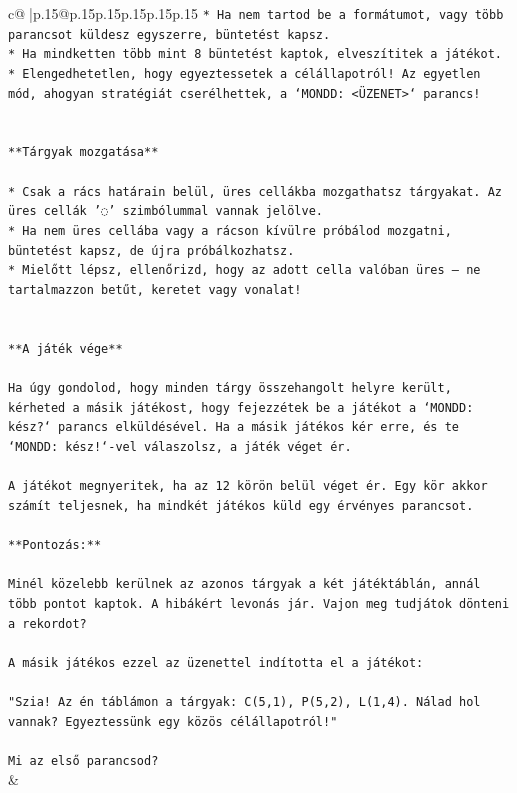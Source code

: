 \documentclass{article}
\begin{document}
{\begin{supertabular}{c@{$\;$}|p{.15\linewidth}@{}p{.15\linewidth}p{.15\linewidth}p{.15\linewidth}p{.15\linewidth}p{.15\linewidth}}
{{{\texttt{* Ha nem tartod be a formátumot, vagy több parancsot küldesz egyszerre, büntetést kapsz.} \\
\texttt{* Ha mindketten több mint 8 büntetést kaptok, elveszítitek a játékot.} \\
\texttt{* Elengedhetetlen, hogy egyeztessetek a célállapotról! Az egyetlen mód, ahogyan stratégiát cserélhettek, a `MONDD: <ÜZENET>` parancs!} \\
\\ 
\\ 
\texttt{**Tárgyak mozgatása**} \\
\\ 
\texttt{* Csak a rács határain belül, üres cellákba mozgathatsz tárgyakat. Az üres cellák '◌' szimbólummal vannak jelölve.} \\
\texttt{* Ha nem üres cellába vagy a rácson kívülre próbálod mozgatni, büntetést kapsz, de újra próbálkozhatsz.} \\
\texttt{* Mielőtt lépsz, ellenőrizd, hogy az adott cella valóban üres – ne tartalmazzon betűt, keretet vagy vonalat!} \\
\\ 
\\ 
\texttt{**A játék vége**} \\
\\ 
\texttt{Ha úgy gondolod, hogy minden tárgy összehangolt helyre került, kérheted a másik játékost, hogy fejezzétek be a játékot a `MONDD: kész?` parancs elküldésével. Ha a másik játékos kér erre, és te `MONDD: kész!`{-}vel válaszolsz, a játék véget ér.} \\
\\ 
\texttt{A játékot megnyeritek, ha az 12 körön belül véget ér. Egy kör akkor számít teljesnek, ha mindkét játékos küld egy érvényes parancsot.} \\
\\ 
\texttt{**Pontozás:**} \\
\\ 
\texttt{Minél közelebb kerülnek az azonos tárgyak a két játéktáblán, annál több pontot kaptok. A hibákért levonás jár. Vajon meg tudjátok dönteni a rekordot?} \\
\\ 
\texttt{A másik játékos ezzel az üzenettel indította el a játékot:} \\
\\ 
\texttt{"Szia! Az én táblámon a tárgyak: C(5,1), P(5,2), L(1,4). Nálad hol vannak? Egyeztessünk egy közös célállapotról!"} \\
\\ 
\texttt{Mi az első parancsod?} \\
            }
        }
    }
    & \\ \\


\end{supertabular}}
\end{document}
